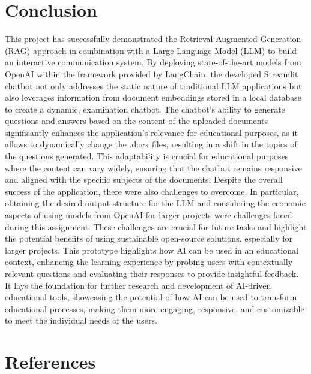 \documentclass{article}
\begin{document}
\section{Conclusion}
This project has successfully demonstrated the Retrieval-Augmented Generation (RAG) approach in combination with a Large Language Model (LLM) to build an interactive communication system. By deploying state-of-the-art models from OpenAI within the framework provided by LangChain, the developed Streamlit chatbot not only addresses the static nature of traditional LLM applications but also leverages information from document embeddings stored in a local database to create a dynamic, examination chatbot. The chatbot's ability to generate questions and answers based on the content of the uploaded documents significantly enhances the application's relevance for educational purposes, as it allows to dynamically change the .docx files, resulting in a shift in the topics of the questions generated. This adaptability is crucial for educational purposes where the content can vary widely, ensuring that the chatbot remains responsive and aligned with the specific subjects of the documents.
\newline
Despite the overall success of the application, there were also challenges to overcome. In particular, obtaining the desired output structure for the LLM and considering the economic aspects of using models from OpenAI for larger projects were challenges faced during this assignment. These challenges are crucial for future tasks and highlight the potential benefits of using sustainable open-source solutions, especially for larger projects.
\newline
This prototype highlights how AI can be used in an educational context, enhancing the learning experience by probing users with contextually relevant questions and evaluating their responses to provide insightful feedback. It lays the foundation for further research and development of AI-driven educational tools, showcasing the potential of how AI can be used to transform educational processes, making them more engaging, responsive, and customizable to meet the individual needs of the users.

\section{References}



\end{document}
